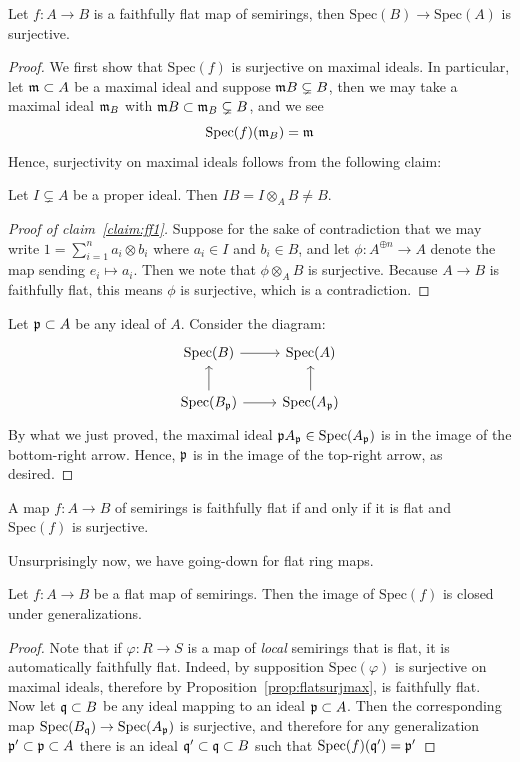 \begin{proposition}\label{prop:ff}
Let $f: A \to B$ is a faithfully flat map of semirings, then $\text{Spec}(B) \to \text{Spec}(A)$ is surjective.
\end{proposition}
\begin{proof}
We first show that $\text{Spec}(f)$ is surjective on maximal ideals. In particular, let $\mathfrak{m} \subset A$ be a maximal ideal and suppose $\mathfrak{m}B \subsetneq B$, 
then we may take a maximal ideal $\mathfrak{m}_B$ with $\mathfrak{m}B \subset \mathfrak{m}_B \subsetneq B$, and we see 
\[\text{Spec}(f)(\mathfrak{m}_B) = \mathfrak{m}\]
Hence, surjectivity on maximal ideals follows from the following claim:
\begin{claim}\label{claim:ff1}
Let $I \subsetneq A$ be a proper ideal. Then $IB=I\otimes_A B \neq B$.
\end{claim}
\begin{proof}[Proof of claim~\ref{claim:ff1}]
Suppose for the sake of contradiction that we may write $1 = \sum_{i=1}^{n} a_i \otimes b_i$ where $a_i \in I$ and $b_i \in B$, and let $\phi: A^{\oplus n} \to A$ denote the map sending $e_i \mapsto a_i$. Then we note that $\phi \otimes_A B$ is surjective. 
Because $A \to B$ is faithfully flat, this means $\phi$ is surjective, which is a contradiction.
\end{proof}
Let $\mathfrak{p} \subset A$ be any ideal of $A$. Consider the diagram:
\[\begin{tikzcd}
\text{Spec}(B) \arrow[r] & \text{Spec}(A) \\
\text{Spec}(B_{\ideal{p}}) \arrow[u] \arrow[r] & \text{Spec}(A_{\ideal{p}}) \arrow[u]
\end{tikzcd}\]
By what we just proved, the maximal ideal $\mathfrak{p}A_{\mathfrak{p}} \in \text{Spec}(A_{\mathfrak{p}})$ is in the image of the bottom-right arrow. Hence, $\mathfrak{p}$ is in the image of the top-right arrow, as desired.
\end{proof}
\begin{corollary}\label{cor:ff=fsurj}
A map $f: A \to B$ of semirings is faithfully flat if and only if it is flat and $\text{Spec}(f)$ is surjective.
\end{corollary}
Unsurprisingly now, we have going-down for flat ring maps.
\begin{theorem}\label{theorem:goingdown}
Let $f: A \to B$ be a flat map of semirings. Then the image of $\text{Spec}(f)$ is closed under generalizations.
\end{theorem}
\begin{proof}
Note that if $\varphi: R \to S$ is a map of \textit{local} semirings that is flat, it is automatically faithfully flat. Indeed, by supposition $\text{Spec}(\varphi)$ is surjective on maximal ideals, 
therefore by Proposition~\ref{prop:flatsurjmax}, is faithfully flat.\\
\indent Now let $\mathfrak{q} \subset B$ be any ideal mapping to an ideal $\mathfrak{p} \subset A$. Then the corresponding map $\text{Spec}(B_{\mathfrak{q}}) \rightarrow \text{Spec}(A_{\mathfrak{p}})$ is surjective, and therefore for any 
generalization $\mathfrak{p}' \subset \mathfrak{p} \subset A$ there is an ideal $\mathfrak{q}' \subset \mathfrak{q} \subset B$ such that $\text{Spec}(f)(\mathfrak{q}') = \mathfrak{p}'$
\end{proof}
